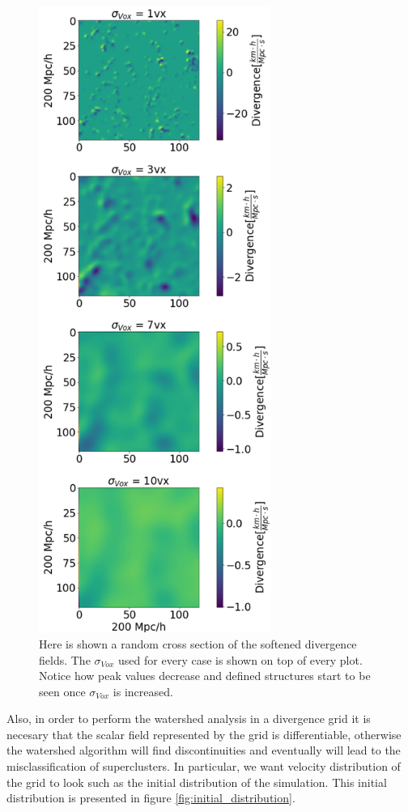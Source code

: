 \documentclass[usenatbib]{mnras}
\begin{document}
\begin{figure}
    \centering
    \includegraphics[height = 580pt]{grad_fields.pdf}
    \caption{Here is shown  a random cross section of the softened divergence fields. The $\sigma_{Vox}$ used for every case is shown on top of every plot. Notice how peak values decrease and defined structures start to be seen once $\sigma_{Vox}$ is increased.}
    \label{fig:SigmasVDCZcut}
\end{figure}
Also, in order to perform the watershed analysis in a divergence grid it is necesary that the scalar field represented by the grid is differentiable, otherwise the watershed algorithm will find discontinuities and eventually will lead to the misclassification of superclusters. In particular, we want velocity distribution of the grid to look such as the initial distribution of the simulation. This initial distribution is presented in figure \ref{fig:initial_distribution}.
\end{document}
